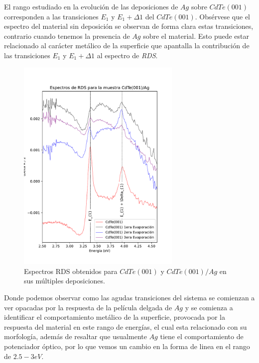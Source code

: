 El rango estudiado en la evolución de las deposiciones de $Ag$ sobre $ CdTe (001) $ corresponden a las transiciones $E_{1}$ y $E_{1}+\Delta1$ del $ CdTe (001)$\cite{Camacho2005}. Obsérvese que el espectro del material sin deposición se observan de forma clara estas transiciones, contrario cuando tenemos la presencia de $Ag$ sobre el material. Esto puede estar relacionado al carácter metálico de la superficie que apantalla la contribución de las transiciones $E_{1}$ y $E_{1}+\Delta1$ al espectro de \textit{RDS}. 

\begin{figure}[H]
    \centering
    \includegraphics[width=0.7\textwidth]{figures/chap4/cdte-ag/rds-results/ag_rds_1.pdf}
        \caption{Espectros RDS obtenidos para $CdTe(001)$ y $CdTe(001)/Ag$ en sus múltiples deposiciones.}
    \label{fig:cdte-rds-1}
\end{figure}

Donde podemos observar como las agudas transiciones del sistema se comienzan a ver opacadas por la respuesta de la película delgada de $ Ag $ y se comienza a identificar el comportamiento metálico de la superficie, provocada por la respuesta del material en este rango de energías, el cual esta relacionado con su morfología, además de resaltar que usualmente $ Ag $ tiene el comportamiento de potenciador óptico, por lo que vemos un cambio en la forma de linea en el rango de $ 2.5-3 eV $.

